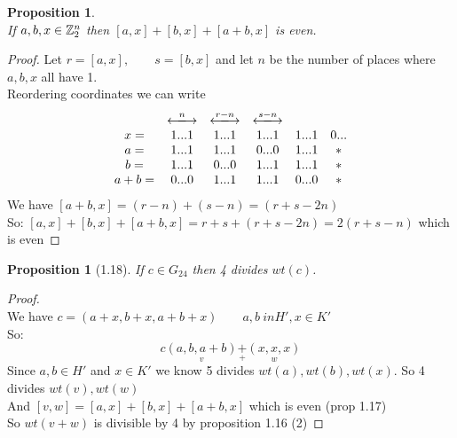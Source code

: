 \documentclass[]{article}
\newtheorem{prop}[thm]{Proposition}
\theoremstyle{definition}
\theoremstyle{remark}
\numberwithin{equation}{section}
\begin{document}
		\begin{prop}\hfill\\
			If $a,b,x \in \mathbb{Z}_2^n$ then $[a,x] + [b,x] + [a+b,x]$ is even.\\
		\end{prop}
		\begin{proof}
			Let $r = [a,x],\qquad s = [b,x]$ and let $n$ be the number of places where $a,b,x$ all have 1.\\
			Reordering coordinates we can write
				\[
					\begin{matrix}
						& \xlongleftrightarrow{n} & \xlongleftrightarrow{r-n} & \xlongleftrightarrow{s-n}\\
					x  =& 1 ... 1  				  &1 ... 1 					  &1 ...1			&1 ...1		    & 0 ...  \\
					a  =& 1 ... 1  				  &1 ... 1 					  &0 ...0			&1 ...1		    & *  \\
					b  =& 1 ... 1  				  &0 ... 0 					  &1 ...1			&1 ...1		    & *  \\
					a+b=& 0 ... 0  				  &1 ... 1 					  &1 ...1			&0 ...0		    & *  \\
					\end{matrix}
				\]
				We have $[a+b, x] = (r-n) + (s-n) = (r+s-2n)$\\
				So: $[a,x] + [b,x] + [a+b,x] = r+s + (r+s-2n) = 2(r+s-n)$ which is even
		\end{proof}

		\begin{prop}[1.18]\hfill
		If $c \in G_24$ then 4 divides $wt(c)$.
		\end{prop}

		\begin{proof}\hfill\\
			We have $c = (a+x, b+x, a+b+x)\qquad a,b \ in H', x\in K'$\\
			So: 
			\[c \underset{v}{(a,b, a+b)} \underset{+}{+} \underset{w}{(x,x,x)}\]
			Since $a,b \in H'$ and $x\in K'$ we know 5 divides $wt(a), wt(b), wt(x)$.
			So 4 divides $wt(v), wt(w)$\\
			And $[v,w] = [a,x] + [b,x] + [a+b, x]$ which is even (prop 1.17)\\
			So $wt(v+w)$ is divisible by 4 by proposition 1.16 (2)\end{proof}
\end{document}
